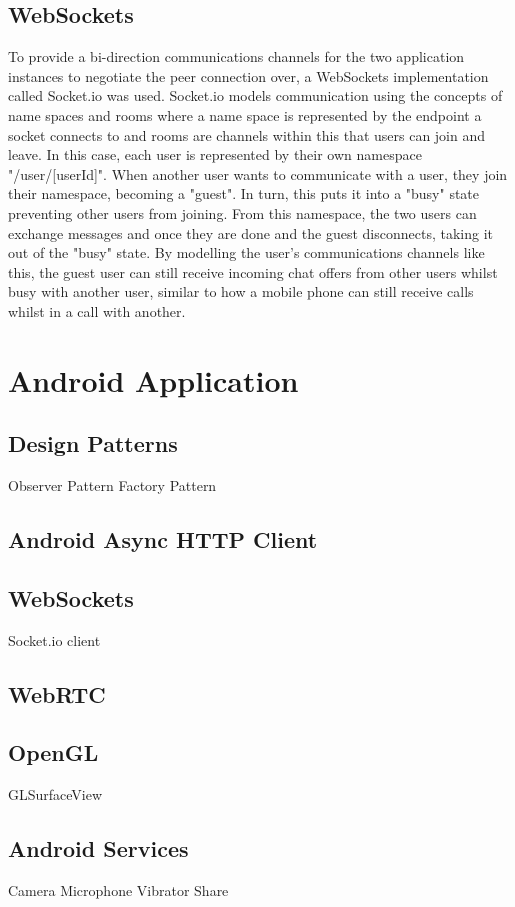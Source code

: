\documentclass[]{report}
\begin{document}
		\subsection{WebSockets}
		To provide a bi-direction communications channels for the two application instances to negotiate the peer connection over, a WebSockets implementation called Socket.io was used. Socket.io models communication using the concepts of name spaces and rooms where a name space is represented by the endpoint a socket connects to and rooms are channels within this that users can join and leave. In this case, each user is represented by their own namespace "/user/[userId]". When another user wants to communicate with a user, they join their namespace, becoming a "guest". In turn, this puts it into a "busy" state preventing other users from joining. From this namespace, the two users can exchange messages and once they are done and the guest disconnects, taking it out of the "busy" state. By modelling the user's communications channels like this, the guest user can still receive incoming chat offers from other users whilst busy with another user, similar to how a mobile phone can still receive calls whilst in a call with another. 
		
	\section{Android Application}
	
		\subsection{Design Patterns}
		Observer Pattern
		Factory Pattern
		\subsection{Android Async HTTP Client}
		\subsection{WebSockets}
		Socket.io client
		\subsection{WebRTC}
		\subsection{OpenGL}
		GLSurfaceView
		\subsection{Android Services}
		Camera
		Microphone
		Vibrator
		Share
\end{document}
